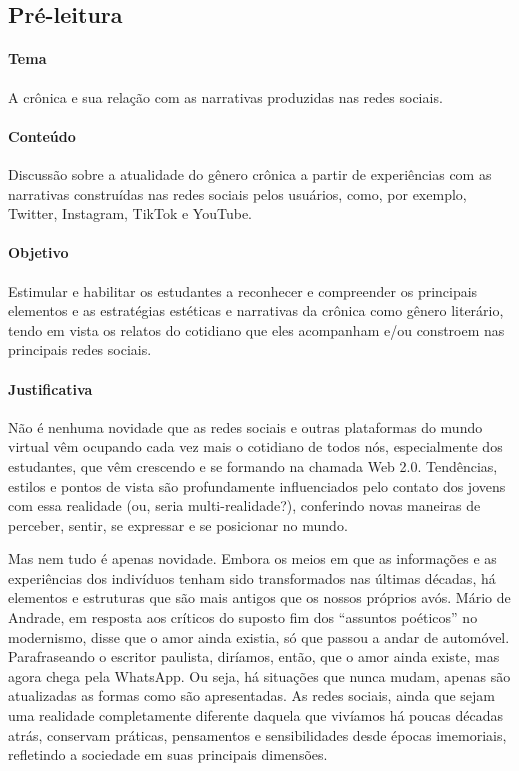 \documentclass[12pt]{extarticle}
\begin{document}


\subsection{Pré-leitura}

\paragraph{Tema} A crônica e sua relação com as narrativas produzidas nas
  redes sociais.


\paragraph{Conteúdo} Discussão sobre a atualidade do gênero crônica a
partir de experiências com as narrativas construídas nas redes sociais
pelos usuários, como, por exemplo, Twitter, Instagram, TikTok e YouTube.

\paragraph{Objetivo} Estimular e habilitar os estudantes a reconhecer e
compreender os principais elementos e as estratégias estéticas e
narrativas da crônica como gênero literário, tendo em vista os relatos
do cotidiano que eles acompanham e/ou constroem nas principais redes
sociais.

\paragraph{Justificativa} Não é nenhuma novidade que as redes sociais e
outras plataformas do mundo virtual vêm ocupando cada vez mais o
cotidiano de todos nós, especialmente dos estudantes, que vêm crescendo
e se formando na chamada Web 2.0. Tendências, estilos e pontos de vista
são profundamente influenciados pelo contato dos jovens com essa
realidade (ou, seria multi-realidade?), conferindo novas maneiras de
perceber, sentir, se expressar e se posicionar no mundo.

Mas nem tudo é apenas novidade. Embora os meios em que as informações e
as experiências dos indivíduos tenham sido transformados nas últimas
décadas, há elementos e estruturas que são mais antigos que os nossos
próprios avós. Mário de Andrade, em resposta aos críticos do suposto fim
dos ``assuntos poéticos'' no modernismo, disse que o amor ainda existia,
só que passou a andar de automóvel. Parafraseando o escritor paulista,
diríamos, então, que o amor ainda existe, mas agora chega pela WhatsApp.
Ou seja, há situações que nunca mudam, apenas são atualizadas as formas
como são apresentadas. As redes sociais, ainda que sejam uma realidade
completamente diferente daquela que vivíamos há poucas décadas atrás,
conservam práticas, pensamentos e sensibilidades desde épocas
imemoriais, refletindo a sociedade em suas principais dimensões.
\end{document}
